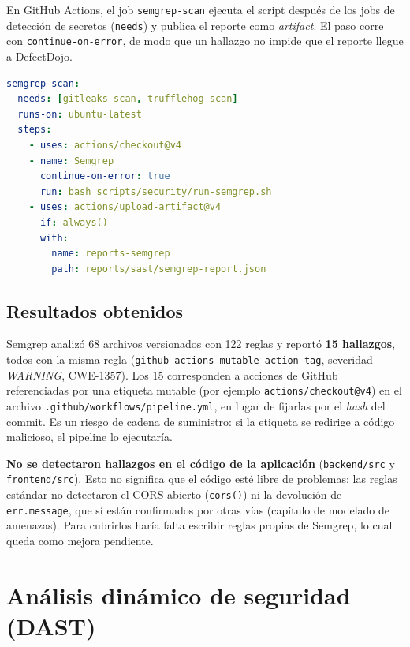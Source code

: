 En GitHub Actions, el job \texttt{semgrep-scan} ejecuta el script después de
los jobs de detección de secretos (\texttt{needs}) y publica el reporte como
\textit{artifact}. El paso corre con \texttt{continue-on-error}, de modo que
un hallazgo no impide que el reporte llegue a DefectDojo.

\begin{lstlisting}[language=yaml, caption={Job de Semgrep en el pipeline.}, label={lst:semgrep}]
semgrep-scan:
  needs: [gitleaks-scan, trufflehog-scan]
  runs-on: ubuntu-latest
  steps:
    - uses: actions/checkout@v4
    - name: Semgrep
      continue-on-error: true
      run: bash scripts/security/run-semgrep.sh
    - uses: actions/upload-artifact@v4
      if: always()
      with:
        name: reports-semgrep
        path: reports/sast/semgrep-report.json
\end{lstlisting}

\subsection{Resultados obtenidos}

Semgrep analizó 68 archivos versionados con 122 reglas y reportó
\textbf{15 hallazgos}, todos con la misma regla
(\texttt{github-actions-mutable-action-tag}, severidad \textit{WARNING},
CWE-1357). Los 15 corresponden a acciones de GitHub referenciadas por una
etiqueta mutable (por ejemplo \texttt{actions/checkout@v4}) en el archivo
\texttt{.github/workflows/pipeline.yml}, en lugar de fijarlas por el
\textit{hash} del commit. Es un riesgo de cadena de suministro: si la
etiqueta se redirige a código malicioso, el pipeline lo ejecutaría.

\textbf{No se detectaron hallazgos en el código de la aplicación}
(\texttt{backend/src} y \texttt{frontend/src}). Esto no significa que el
código esté libre de problemas: las reglas estándar no detectaron el CORS
abierto (\texttt{cors()}) ni la devolución de \texttt{err.message}, que sí
están confirmados por otras vías (capítulo de modelado de amenazas). Para
cubrirlos haría falta escribir reglas propias de Semgrep, lo cual queda como
mejora pendiente.


\section{Análisis dinámico de seguridad (DAST)}

